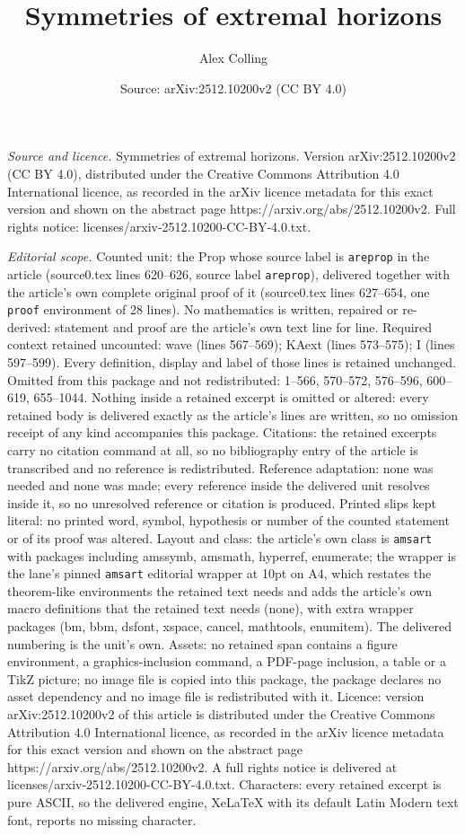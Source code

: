 \documentclass[10pt,a4paper]{amsart}
\title[Symmetries of extremal horizons]{Symmetries of extremal horizons}
\author{Alex Colling}
\date{Source: arXiv:2512.10200v2 (CC BY 4.0)}
\begin{document}
\maketitle

\noindent\emph{Source and licence.} Symmetries of extremal horizons. Version arXiv:2512.10200v2 (CC BY 4.0), distributed under the Creative Commons Attribution 4.0 International licence, as recorded in the arXiv licence metadata for this exact version and shown on the abstract page https://arxiv.org/abs/2512.10200v2. Full rights notice: licenses/arxiv-2512.10200-CC-BY-4.0.txt.\par\smallskip

\noindent\textit{Editorial scope.} Counted unit: the Prop whose source label is \texttt{areprop} in the article (source0.tex lines 620--626, source label \texttt{areprop}), delivered together with the article's own complete original proof of it (source0.tex lines 627--654, one \texttt{proof} environment of 28 lines). No mathematics is written, repaired or re-derived: statement and proof are the article's own text line for line. Required context retained uncounted: wave (lines 567--569); KAext (lines 573--575); I (lines 597--599). Every definition, display and label of those lines is retained unchanged. Omitted from this package and not redistributed: 1--566, 570--572, 576--596, 600--619, 655--1044. Nothing inside a retained excerpt is omitted or altered: every retained body is delivered exactly as the article's lines are written, so no omission receipt of any kind accompanies this package. Citations: the retained excerpts carry no citation command at all, so no bibliography entry of the article is transcribed and no reference is redistributed. Reference adaptation: none was needed and none was made; every reference inside the delivered unit resolves inside it, so no unresolved reference or citation is produced. Printed slips kept literal: no printed word, symbol, hypothesis or number of the counted statement or of its proof was altered. Layout and class: the article's own class is \texttt{amsart} with packages including amssymb, amsmath, hyperref, enumerate; the wrapper is the lane's pinned \texttt{amsart} editorial wrapper at 10pt on A4, which restates the theorem-like environments the retained text needs and adds the article's own macro definitions that the retained text needs (none), with extra wrapper packages (bm, bbm, dsfont, xspace, cancel, mathtools, enumitem). The delivered numbering is the unit's own. Assets: no retained span contains a figure environment, a graphics-inclusion command, a PDF-page inclusion, a table or a TikZ picture; no image file is copied into this package, the package declares no asset dependency and no image file is redistributed with it. Licence: version arXiv:2512.10200v2 of this article is distributed under the Creative Commons Attribution 4.0 International licence, as recorded in the arXiv licence metadata for this exact version and shown on the abstract page https://arxiv.org/abs/2512.10200v2. A full rights notice is delivered at licenses/arxiv-2512.10200-CC-BY-4.0.txt. Characters: every retained excerpt is pure ASCII, so the delivered engine, XeLaTeX with its default Latin Modern text font, reports no missing character.
\end{document}
